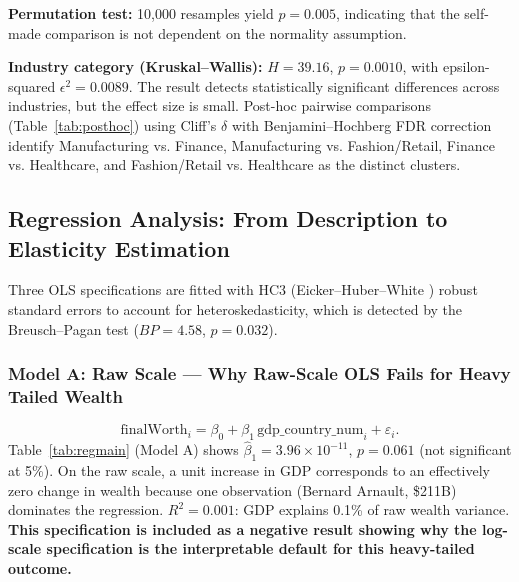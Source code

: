 \documentclass[a4paper,10pt]{article}
\begin{document}
\textbf{Permutation test:} 10,000 resamples yield $p = 0.005$, indicating that the self-made comparison is not dependent on the normality assumption.

\textbf{Industry category (Kruskal--Wallis):} $H = 39.16$, $p = 0.0010$, with epsilon-squared $\epsilon^2 = 0.0089$. The result detects statistically significant differences across industries, but the effect size is small.
Post-hoc pairwise comparisons (Table~\ref{tab:posthoc}) using Cliff's $\delta$ with Benjamini--Hochberg FDR correction \cite{benjamini1995} identify Manufacturing vs. Finance, Manufacturing vs. Fashion/Retail, Finance vs. Healthcare, and Fashion/Retail vs. Healthcare as the distinct clusters.

\begin{table}[H]
\centering
\caption{Post-hoc pairwise industry comparisons (Cliff's $\delta$, BH-FDR corrected). Only pairs with $p_{\text{FDR}} < 0.05$ shown. $\delta > 0$ means the row category tends to outrank the column category.}
\label{tab:posthoc}
\scriptsize

\end{table}

\bigskip

\subsection{Regression Analysis: From Description to Elasticity Estimation}\label{sec:reg}

Three OLS specifications are fitted with HC3 (Eicker--Huber--White \cite{white1980}) robust standard errors to account for heteroskedasticity, which is detected by the Breusch--Pagan test ($BP = 4.58$, $p = 0.032$).

\bigskip

\subsubsection{Model A: Raw Scale --- Why Raw-Scale OLS Fails for Heavy Tailed Wealth}
\[
\mathrm{finalWorth}_i = \beta_0 + \beta_1\,\mathrm{gdp\_country\_num}_i + \varepsilon_i.
\]
Table~\ref{tab:regmain} (Model A) shows $\hat\beta_1 = 3.96\times10^{-11}$, $p = 0.061$ (not significant at 5\%).
On the raw scale, a unit increase in GDP corresponds to an effectively zero change in wealth because one observation (Bernard Arnault, \$211B) dominates the regression.
$R^2 = 0.001$: GDP explains 0.1\% of raw wealth variance.
\textbf{This specification is included as a negative result showing why the log-scale specification is the interpretable default for this heavy-tailed outcome.}
\end{document}
